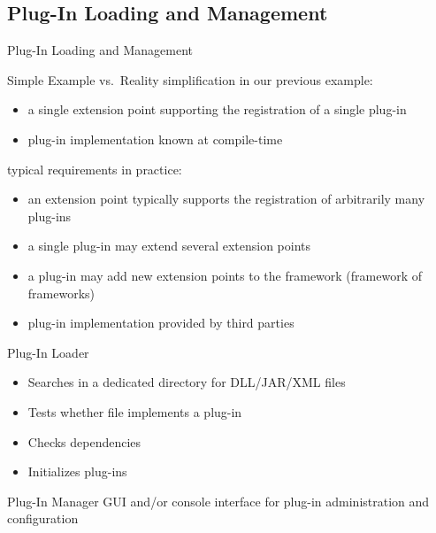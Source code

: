 \subsection{Plug-In Loading and Management}
\begin{frame}{Plug-In Loading and Management}
	\begin{mycolumns}
		\begin{note}{Simple Example vs.\ Reality}
			simplification in our previous example:
			\begin{itemize}
				\item a single extension point supporting the registration of a single plug-in 
				\item plug-in implementation known at compile-time 
			\end{itemize}
			typical requirements in practice:
			\begin{itemize}
				\item an extension point typically supports the registration of arbitrarily many plug-ins
				\item a single plug-in may extend several extension points
				\item a plug-in may add new extension points to the framework (framework of frameworks)
				\item plug-in implementation provided by third parties %
			\end{itemize}
		\end{note}
	\mynextcolumn
		\begin{definition}{Plug-In Loader}
			\begin{itemize}
				\item Searches in a dedicated directory for DLL/JAR/XML files
				\item Tests whether file implements a plug-in
				\item Checks dependencies
				\item Initializes plug-ins
			\end{itemize}
		\end{definition}
		\begin{definition}{Plug-In Manager}
			GUI and/or console interface for plug-in administration and configuration
		\end{definition}
	\end{mycolumns}
\end{frame}

